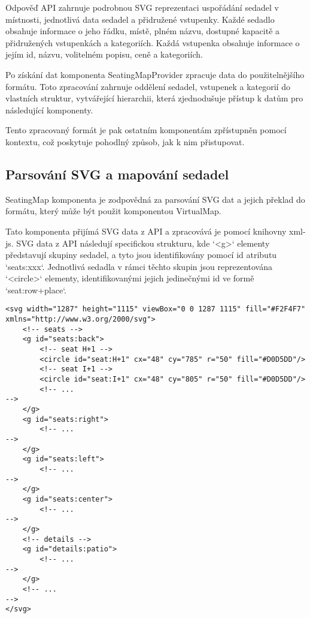 Odpověď API zahrnuje podrobnou SVG reprezentaci uspořádání sedadel v místnosti, jednotlivá data sedadel a přidružené vstupenky.
Každé sedadlo obsahuje informace o jeho řádku, místě, plném názvu, dostupné kapacitě a přidružených vstupenkách a kategoriích.
Každá vstupenka obsahuje informace o jejím id, názvu, volitelném popisu, ceně a kategoriích.

Po získání dat komponenta SeatingMapProvider zpracuje data do použitelnějšího formátu.
Toto zpracování zahrnuje oddělení sedadel, vstupenek a kategorií do vlastních struktur, vytvářející hierarchii, která zjednodušuje přístup k datům pro následující komponenty.

Tento zpracovaný formát je pak ostatním komponentám zpřístupněn pomocí kontextu, což poskytuje pohodlný způsob, jak k nim přistupovat.

\subsection{Parsování SVG a mapování sedadel}
\label{subsec:implementace-seating-svg}
SeatingMap komponenta je zodpovědná za parsování SVG dat a jejich překlad do formátu, který může být použit komponentou VirtualMap.

Tato komponenta přijímá SVG data z API a zpracovává je pomocí knihovny xml-js.
SVG data z API následují specifickou strukturu, kde `<g>` elementy představují skupiny sedadel, a tyto jsou identifikovány pomocí id atributu `seats:xxx`.
Jednotlivá sedadla v rámci těchto skupin jsou reprezentována `<circle>` elementy, identifikovanými jejich jedinečnými id ve formě `seat:row+place`.

\begin{verbatim}
<svg width="1287" height="1115" viewBox="0 0 1287 1115" fill="#F2F4F7" xmlns="http://www.w3.org/2000/svg">
    <!-- seats -->
    <g id="seats:back">
        <!-- seat H+1 -->
        <circle id="seat:H+1" cx="48" cy="785" r="50" fill="#D0D5DD"/>
        <!-- seat I+1 -->
        <circle id="seat:I+1" cx="48" cy="805" r="50" fill="#D0D5DD"/>
        <!-- ...
-->
    </g>
    <g id="seats:right">
        <!-- ...
-->
    </g>
    <g id="seats:left">
        <!-- ...
-->
    </g>
    <g id="seats:center">
        <!-- ...
-->
    </g>
    <!-- details -->
    <g id="details:patio">
        <!-- ...
-->
    </g>
    <!-- ...
-->
</svg>
\end{verbatim}

